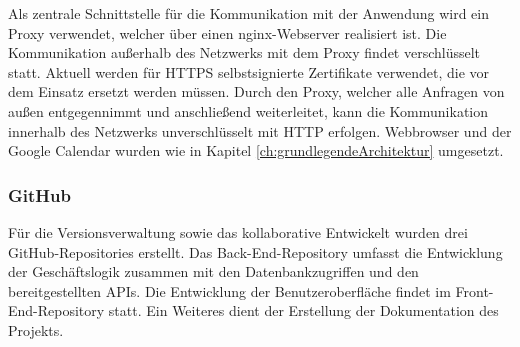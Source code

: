 Als zentrale Schnittstelle für die Kommunikation mit der Anwendung wird ein Proxy verwendet, welcher über einen nginx-Webserver realisiert ist.
Die Kommunikation außerhalb des Netzwerks mit dem Proxy findet verschlüsselt statt.
Aktuell werden für \acs{HTTPS} selbstsignierte Zertifikate verwendet, die vor dem Einsatz ersetzt werden müssen.
Durch den Proxy, welcher alle Anfragen von außen entgegennimmt und anschließend weiterleitet, kann die Kommunikation innerhalb des Netzwerks unverschlüsselt mit \acs{HTTP} erfolgen.
Webbrowser und der Google Calendar wurden wie in Kapitel \ref{ch:grundlegendeArchitektur} umgesetzt.

\subsubsection{GitHub}
Für die Versionsverwaltung sowie das kollaborative Entwickelt wurden drei GitHub-Repositories erstellt.
Das Back-End-Repository umfasst die Entwicklung der Geschäftslogik zusammen mit den Datenbankzugriffen und den bereitgestellten \ac{API}s.
Die Entwicklung der Benutzeroberfläche findet im Front-End-Repository statt.
Ein Weiteres dient der Erstellung der Dokumentation des Projekts.